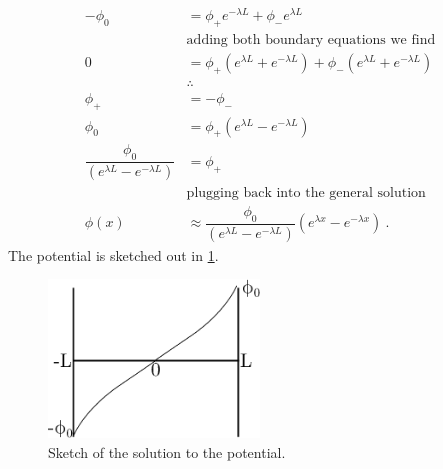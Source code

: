 \documentclass[10pt,a4paper]{article}
\begin{document}
\begin{subequations}
\begin{align}
			-\phi_{0} &= \phi_{+} e^{-\lambda L} + \phi_{-} e^{\lambda L} \\
			&\textrm{adding both boundary equations we find} \nonumber\\
			0 &= \phi_{+} \left(e^{\lambda L} + e^{-\lambda L} \right) + \phi_{-} \left(e^{\lambda L} + e^{-\lambda L} \right)\\
			&\therefore \nonumber\\
			\phi_{+} &= -\phi_{-}\\
			\phi_{0} &= \phi_{+} \left(e^{\lambda L} - e^{-\lambda L} \right)\\
			\dfrac{\phi_{0}}{\left(e^{\lambda L} - e^{-\lambda L} \right)} &= \phi_{+}\\
			&\textrm{plugging back into the general solution}\nonumber\\
			\phi(x) &\approx \dfrac{\phi_{0}}{\left(e^{\lambda L} - e^{-\lambda L} \right)} \left(e^{\lambda x} - e^{-\lambda x}\right)~.
		\end{align}
	\end{subequations}
	The potential is sketched out in \cref{f:potential}.
	\begin{figure}
		\centering
		\includegraphics[width=0.5\textwidth]{potential.eps}
		\caption{Sketch of the solution to the potential.}
		\label{f:potential}
	\end{figure}
	
\end{document}
